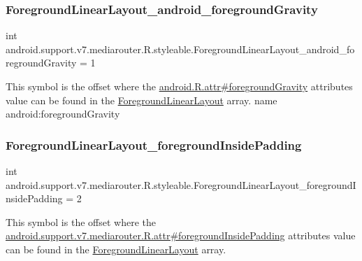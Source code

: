 \subsubsection{\texorpdfstring{Foreground\+Linear\+Layout\+\_\+android\+\_\+foreground\+Gravity}{ForegroundLinearLayout\_android\_foregroundGravity}}
{\footnotesize\ttfamily int android.\+support.\+v7.\+mediarouter.\+R.\+styleable.\+Foreground\+Linear\+Layout\+\_\+android\+\_\+foreground\+Gravity = 1\hspace{0.3cm}{\ttfamily [static]}}

This symbol is the offset where the \hyperlink{}{android.\+R.\+attr\#foreground\+Gravity} attribute\textquotesingle{}s value can be found in the \hyperlink{classandroid_1_1support_1_1v7_1_1mediarouter_1_1R_1_1styleable_a49fc131534b262fe1dc04e9f42f46d9b}{Foreground\+Linear\+Layout} array.  name android\+:foreground\+Gravity \mbox{\label{classandroid_1_1support_1_1v7_1_1mediarouter_1_1R_1_1styleable_a99710c55c5f5f29b77ac73ecd8f54630}} 
\subsubsection{\texorpdfstring{Foreground\+Linear\+Layout\+\_\+foreground\+Inside\+Padding}{ForegroundLinearLayout\_foregroundInsidePadding}}
{\footnotesize\ttfamily int android.\+support.\+v7.\+mediarouter.\+R.\+styleable.\+Foreground\+Linear\+Layout\+\_\+foreground\+Inside\+Padding = 2\hspace{0.3cm}{\ttfamily [static]}}

This symbol is the offset where the \hyperlink{classandroid_1_1support_1_1v7_1_1mediarouter_1_1R_1_1attr_a129677eb00ce5dab4f2c98640e902998}{android.\+support.\+v7.\+mediarouter.\+R.\+attr\#foreground\+Inside\+Padding} attribute\textquotesingle{}s value can be found in the \hyperlink{classandroid_1_1support_1_1v7_1_1mediarouter_1_1R_1_1styleable_a49fc131534b262fe1dc04e9f42f46d9b}{Foreground\+Linear\+Layout} array.


